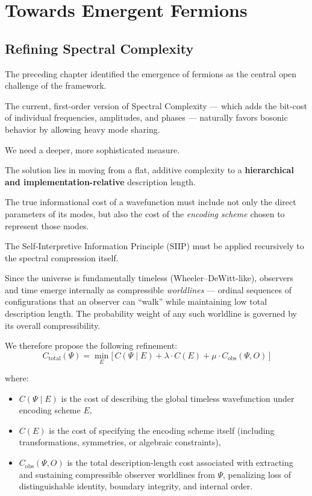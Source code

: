 \chapter{Towards Emergent Fermions}

\section{Refining Spectral Complexity}

The preceding chapter identified the emergence of fermions as the central open challenge of the framework.

The current, first-order version of Spectral Complexity — which adds the bit-cost of individual frequencies, amplitudes, and phases — naturally favors bosonic behavior by allowing heavy mode sharing.

We need a deeper, more sophisticated measure.

The solution lies in moving from a flat, additive complexity to a \textbf{hierarchical and implementation-relative} description length.

The true informational cost of a wavefunction must include not only the direct parameters of its modes, but also the cost of the \emph{encoding scheme} chosen to represent those modes.

The Self-Interpretive Information Principle (SIIP) must be applied recursively to the spectral compression itself.

Since the universe is fundamentally timeless (Wheeler--DeWitt-like), observers and time emerge internally as compressible \emph{worldlines} — ordinal sequences of configurations that an observer can ``walk'' while maintaining low total description length.
The probability weight of any such worldline is governed by its overall compressibility.

We therefore propose the following refinement:
\[
C_{\text{total}}(\Psi) = \min_{E} \Big[ \, C(\Psi \mid E) + \lambda \cdot C(E) + \mu \cdot C_{\text{obs}}(\Psi, O) \, \Big]
\]

where:

\begin{itemize}
\item \(C(\Psi \mid E)\) is the cost of describing the global timeless wavefunction under encoding scheme \(E\),
\item \(C(E)\) is the cost of specifying the encoding scheme itself (including transformations, symmetries, or algebraic constraints),
\item \(C_{\text{obs}}(\Psi, O)\) is the total description-length cost associated with extracting and sustaining compressible observer worldlines from \(\Psi\), penalizing loss of distinguishable identity, boundary integrity, and internal order.
\end{itemize}

